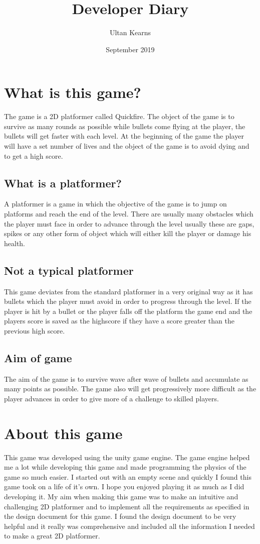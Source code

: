 \documentclass{report}
\title{Developer Diary}
\author{Ultan Kearns}
\date{September 2019}
\begin{document}
\maketitle
\tableofcontents

\section{What is this game?}
The game is a 2D platformer called Quickfire.  
The object of the game is 
to survive as many rounds as possible while bullets come flying at the player, the bullets will get faster with each level. At the beginning of the game the player will have a set number of lives and the object of the game is to avoid dying and to get a high score.
\subsection{What is a platformer?}
A platformer is a game in which the objective of the game is to jump on platforms and reach the end of the level.  There are usually many obstacles which the player must face in order to advance through the level usually these are gaps, spikes or any other form of object which will either kill the player or damage his health.
\subsection{Not a typical platformer}
This game deviates from the standard platformer in a very original way as it has bullets which the player must avoid in order to progress through the level.  If the player is hit by a bullet or the player falls off the platform the game end and the players score is saved as the highscore if they have a score greater than the previous high score.
\subsection{Aim of game}
The aim of the game is to survive wave after wave of bullets and accumulate as many points as possible.  The game also will get progressively more difficult as the player advances in order to give more of a challenge to skilled players.
\section{About this game}
 This game was developed using the unity game engine.  The game engine helped me a lot while developing this game and made programming the physics of the game so much easier.  I started out with an empty scene and quickly I found this game took on a life of it's own.  I hope you enjoyed playing it as much as I did developing it.  My aim when making this game was to make an intuitive and challenging 2D platformer and to implement all the requirements as specified in the design document for this game.  I found the design document to be very helpful and it really was comprehensive and included all the information I needed to make a great 2D platformer.
\end{document}

